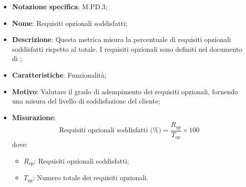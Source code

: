 \begin{itemize}
    \item \textbf{Notazione specifica}: M.PD.3;
    \item \textbf{Nome}: Requisiti opzionali soddisfatti;
    \item \textbf{Descrizione}: Questa metrica misura la percentuale di requisiti opzionali soddisfatti rispetto al totale. I requisiti opzionali sono definiti nel documento di \VersioneAR;
    \item \textbf{Caratteristiche}: Funzionalità;
    \item \textbf{Motivo}: Valutare il grado di adempimento dei requisiti opzionali, fornendo una misura del livello di soddisfazione del cliente;
    \item \textbf{Misurazione}:
    \[
    \text{Requisiti opzionali soddisfatti (\%)} = \frac{R_{op}}{T_{op}} \times 100
    \]
    dove:
    \begin{itemize}
        \item $R_{op}$: Requisiti opzionali soddisfatti;
        \item $T_{op}$: Numero totale dei requisiti opzionali.
    \end{itemize}
\end{itemize}